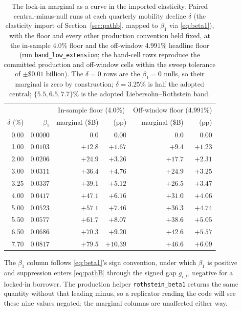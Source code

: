 \documentclass[12pt]{article}
\begin{document}
\begin{table}[!t]
\centering
\caption{The lock-in marginal as a curve in the imported elasticity. Paired central-minus-null runs at each quarterly mobility decline $\delta$ (the elasticity import of Section~\ref{sec:pathb}, mapped to $\beta_1$ via \eqref{eq:beta1}), with the floor and every other production convention held fixed, at the in-sample 4.0\% floor and the off-window 4.991\% headline floor (run \texttt{band\_low\_extension}; the band-cell rows reproduce the committed production and off-window cells within the sweep tolerance of $\pm\$0.01$ billion). The $\delta = 0$ rows are the $\beta_1 = 0$ nulls, so their marginal is zero by construction; $\delta = 3.25\%$ is half the adopted central; $\{5.5, 6.5, 7.7\}\%$ is the adopted Liebersohn--Rothstein band.}
\label{tab:lowband}
\footnotesize
\begin{threeparttable}
\begin{tabular}{@{}rrrrrr@{}}
\toprule
& & \multicolumn{2}{c}{In-sample floor (4.0\%)} & \multicolumn{2}{c}{Off-window floor (4.991\%)} \\
\cmidrule(lr){3-4}\cmidrule(lr){5-6}
$\delta$ (\%) & $\beta_1$ & marginal (\$B) & (pp) & marginal (\$B) & (pp) \\
\midrule
0.00 & $0.0000$ & $0.0$ & $0.00$ & $0.0$ & $0.00$ \\
1.00 & $0.0103$ & $+12.8$ & $+1.67$ & $+9.4$ & $+1.23$ \\
2.00 & $0.0206$ & $+24.9$ & $+3.26$ & $+17.7$ & $+2.31$ \\
3.00 & $0.0311$ & $+36.4$ & $+4.76$ & $+24.9$ & $+3.25$ \\
3.25 & $0.0337$ & $+39.1$ & $+5.12$ & $+26.5$ & $+3.47$ \\
4.00 & $0.0417$ & $+47.1$ & $+6.16$ & $+31.0$ & $+4.06$ \\
5.00 & $0.0523$ & $+57.1$ & $+7.46$ & $+36.3$ & $+4.74$ \\
5.50 & $0.0577$ & $+61.7$ & $+8.07$ & $+38.6$ & $+5.05$ \\
6.50 & $0.0686$ & $+70.3$ & $+9.20$ & $+42.6$ & $+5.57$ \\
7.70 & $0.0817$ & $+79.5$ & $+10.39$ & $+46.6$ & $+6.09$ \\
\bottomrule
\end{tabular}
\begin{tablenotes}[flushleft]\footnotesize
\item The $\beta_1$ column follows \eqref{eq:beta1}'s sign convention, under which $\beta_1$ is positive and suppression enters \eqref{eq:pathB} through the signed gap $g_{i,t}$, negative for a locked-in borrower. The production helper \texttt{rothstein\_beta1} returns the same quantity without that leading minus, so a replicator reading the code will see these nine values negated; the marginal columns are unaffected either way.
\end{tablenotes}
\end{threeparttable}
\end{table}
\end{document}
